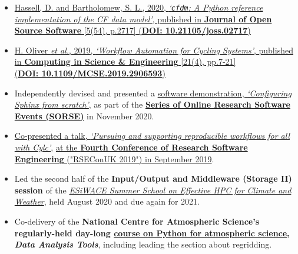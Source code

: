 \documentclass[10pt,a4paper]{cv_template}
\begin{document}
\begin{paracol}{2}

\begin{itemize}
  \item \href{https://joss.theoj.org/papers/10.21105/joss.02717}{Hassell, D. and Bartholomew, S. L., 2020, \textit{`\texttt{cfdm}: A Python reference implementation of the CF data model'}, published in \textbf{Journal of Open Source Software} [5(54), p.2717] ({\color{Bright}\textbf{DOI: 10.21105/joss.02717}})}
  \item \href{https://ieeexplore.ieee.org/document/8675433}{H. Oliver \textit{et al.}, 2019, \textit{`Workflow Automation for Cycling Systems'}, published in \textbf{Computing in Science \& Engineering} [21(4), pp.7-21] \\({\color{Bright}\textbf{DOI: 10.1109/MCSE.2019.2906593}})}
\end{itemize}



\begin{itemize}
  \item Independently devised and presented a \href{https://sorse.github.io/programme/software-demos/event-011/}{software demonstration, \textit{`Configuring Sphinx from scratch'}}, as part of the \href{https://sorse.github.io/}{\textbf{Series of Online Research Software Events (SORSE)}} in November 2020.
  \item \href{https://metomi.github.io/presentations/RSEConUK2019-Cylc-Talk/#/title-slide}{Co-presented a talk, \textit{`Pursuing and supporting reproducible workflows for all with Cylc'}}, \href{https://rseconuk2019.sched.com/event/QSSI/5d2-hpc-pursuing-and-supporting-reproducible-workflows-for-all-with-cylc}{at the \textbf{Fourth Conference of Research Software Engineering} ("RSEConUK 2019") in September 2019}.
\end{itemize}



\begin{itemize}
  \item Led the second half of the \textbf{Input/Output and Middleware (Storage II) session} of the \href{https://hps.vi4io.org/events/2020/esiwace-school}{\textit{ESiWACE Summer School on Effective HPC for Climate and Weather}}, held August 2020 and due again for 2021.
  \item Co-delivery of the \textbf{National Centre for Atmospheric Science's regularly-held day-long \href{https://ncas.ac.uk/study-with-us/data-analysis-tools/}{course on Python for atmospheric science}, \textit{Data Analysis Tools}}, including leading the section about regridding.
\end{itemize}



\end{paracol}
\end{document}
